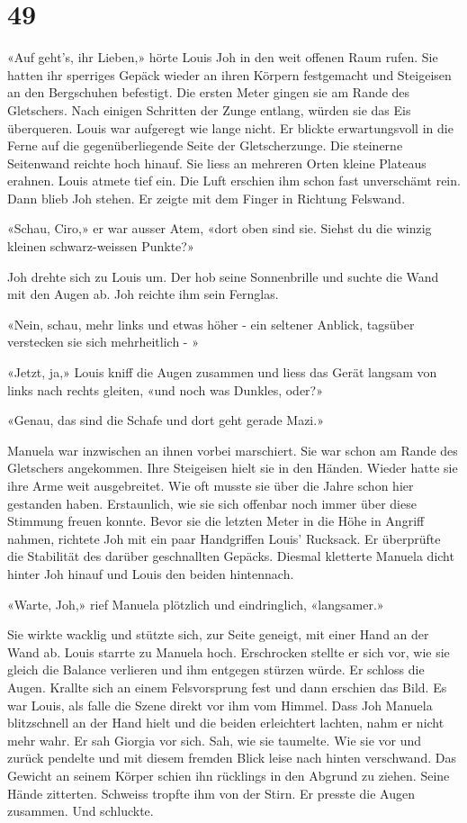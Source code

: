 \chapter{49}





«Auf geht’s, ihr Lieben,» hörte Louis Joh in den weit offenen Raum
rufen. Sie hatten ihr sperriges Gepäck wieder an ihren Körpern
festgemacht und Steigeisen an den Bergschuhen befestigt. Die ersten
Meter gingen sie am Rande des Gletschers.
Nach einigen Schritten der Zunge entlang, würden sie das Eis überqueren.
Louis war aufgeregt wie lange nicht. Er blickte erwartungsvoll in die
Ferne auf die gegenüberliegende Seite der Gletscherzunge. Die steinerne
Seitenwand reichte hoch hinauf. Sie liess an mehreren Orten kleine
Plateaus erahnen.
Louis atmete tief ein. Die Luft erschien ihm schon fast unverschämt
rein. Dann blieb Joh stehen. Er zeigte mit dem Finger in Richtung
Felswand.

«Schau, Ciro,» er war ausser Atem, «dort oben sind sie. Siehst du die
winzig kleinen schwarz-weissen Punkte?»

Joh drehte sich zu Louis um. Der hob seine Sonnenbrille und suchte die
Wand mit den Augen ab. Joh reichte ihm sein Fernglas.

«Nein, schau, mehr links und etwas höher - ein seltener Anblick, tagsüber verstecken sie sich mehrheitlich - »

«Jetzt, ja,» Louis kniff die Augen zusammen und liess das Gerät langsam von links nach rechts gleiten, «und noch was Dunkles, oder?»

«Genau, das sind die Schafe und dort geht gerade Mazi.»

Manuela war inzwischen an ihnen vorbei marschiert. Sie war schon am
Rande des Gletschers angekommen. Ihre Steigeisen hielt sie in den
Händen. Wieder hatte sie ihre Arme weit ausgebreitet. Wie oft musste sie
über die Jahre schon hier gestanden haben. Erstaunlich, wie sie sich
offenbar noch immer über diese Stimmung freuen konnte.
Bevor sie die letzten Meter in die Höhe in Angriff nahmen, richtete Joh mit ein paar Handgriffen Louis’ Rucksack. Er
überprüfte die Stabilität des darüber geschnallten Gepäcks. Diesmal kletterte Manuela dicht hinter Joh hinauf und Louis den beiden hintennach.

«Warte, Joh,» rief Manuela plötzlich und eindringlich, «langsamer.»

Sie wirkte wacklig und stützte sich, zur Seite geneigt, mit einer Hand
an der Wand ab.
Louis starrte zu Manuela hoch. Erschrocken stellte er sich vor, wie sie
gleich die Balance verlieren und ihm entgegen stürzen würde. Er schloss
die Augen. Krallte sich an einem Felsvorsprung fest und dann erschien das
Bild. Es war Louis, als falle die Szene direkt vor ihm vom Himmel. 
Dass Joh Manuela blitzschnell an der Hand hielt und die beiden
erleichtert lachten, nahm er nicht mehr wahr.
Er sah Giorgia vor sich. Sah, wie sie taumelte. Wie sie vor und zurück pendelte und mit
diesem fremden Blick leise nach hinten verschwand.
Das Gewicht an seinem Körper schien ihn rücklings in den Abgrund zu
ziehen. Seine Hände zitterten. Schweiss tropfte ihm von der Stirn. Er presste die Augen zusammen. Und schluckte.

